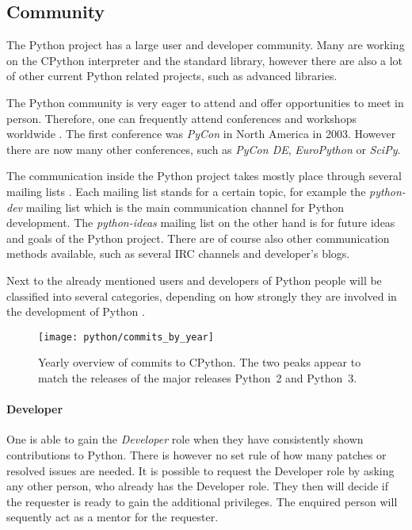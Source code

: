 
\subsection{Community} %

The Python project has a large user and developer community. Many are working
on the CPython interpreter and the standard library, however there are also a
lot of other current Python related projects, such as advanced libraries.

The Python community is very eager to attend and offer opportunities to meet in
person. Therefore, one can frequently attend conferences and workshops
worldwide \cite{PythonConferences}. The first conference was \emph{PyCon} in
North America in 2003. However there are now many other conferences, such as
\emph{PyCon DE}, \emph{EuroPython} or \emph{SciPy}.

The communication inside the Python project takes mostly place through several
mailing lists \cite{PythonCommunication}. Each mailing list stands for a
certain topic, for example the \emph{python-dev} mailing list which is the main
communication channel for Python development. The \emph{python-ideas} mailing
list on the other hand is for future ideas and goals of the Python project.
There are of course also other communication methods available, such as several
\ac{IRC} channels and developer's blogs.

Next to the already mentioned users and developers of Python people will be
classified into several categories, depending on how strongly they are involved
in the development of Python \cite{PythonCoreDeveloper}.

\begin{figure}[htbp]
  \centering
  \texttt{[image: python/commits\_by\_year]}
  \caption[Commits by year, Python]
  {Yearly overview of commits to CPython. The two peaks appear to match the
    releases of the major releases Python~2 and Python~3.}
\end{figure}

\paragraph{Developer}

One is able to gain the \emph{Developer} role when they have consistently shown
contributions to Python. There is however no set rule of how many patches or
resolved issues are needed. It is possible to request the Developer role by
asking any other person, who already has the Developer role. They then will
decide if the requester is ready to gain the additional privileges. The
enquired person will sequently act as a mentor for the requester.

